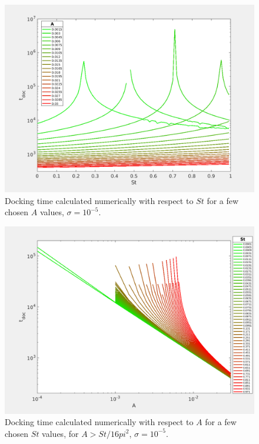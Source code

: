 \documentclass[../main.tex]{subfiles}
\begin{document}
\begin{figure}
\centering
\noindent \includegraphics[width=30pc]{gfx/St_t_doc_A_full_eps000001.png}
\caption{Docking time calculated numerically with respect to  $St$ for a few chosen $A$ values, $\sigma=10^{-5}$.}
\label{fig:ch3_5}
\end{figure}

\begin{figure}
\centering
\noindent \includegraphics[width=30pc]{gfx/A_t_doc_St_part_right_eps000001.png}
\caption{Docking time calculated numerically with respect to $A$ for a few chosen $St$ values, for $A>St/16pi^2$, $\sigma=10^{-5}$.}
\label{fig:ch3_5a}
\end{figure}
\end{document}
